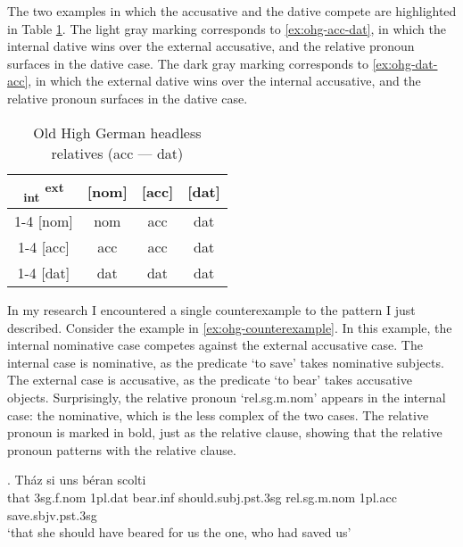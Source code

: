 The two examples in which the accusative and the dative compete are highlighted in Table \ref{tbl:summary-old-high-german-acc-dat}. The light gray marking corresponds to \ref{ex:ohg-acc-dat}, in which the internal dative wins over the external accusative, and the relative pronoun surfaces in the dative case. The dark gray marking corresponds to \ref{ex:ohg-dat-acc}, in which the external dative wins over the internal accusative, and the relative pronoun surfaces in the dative case.

\begin{table}[H]
  \center
  \caption{Old High German headless relatives (\ac{acc} --- \ac{dat})}
  \begin{tabular}{c|c|c|c}
    \toprule
        \textsubscript{\ac{int}} \textsuperscript{\ac{ext}}
          & [\ac{nom}]
          & [\ac{acc}]
          & [\ac{dat}]
          \\ \cmidrule{1-4}
      [\ac{nom}]
          & \ac{nom}
          & \ac{acc}
          & \ac{dat}
          \\ \cmidrule{1-4}
      [\ac{acc}]
          & \ac{acc}
          & \ac{acc}
          & \cellcolor{DG}\ac{dat}
          \\ \cmidrule{1-4}
      [\ac{dat}]
          & \ac{dat}
          & \cellcolor{LG}\ac{dat}
          & \ac{dat}
          \\
    \bottomrule
  \end{tabular}
    \label{tbl:summary-old-high-german-acc-dat}
\end{table}

In my research I encountered a single counterexample to the pattern I just described.
Consider the example in \ref{ex:ohg-counterexample}. In this example, the internal nominative case competes against the external accusative case.
The internal case is nominative, as the predicate  `to save' takes nominative subjects.
The external case is accusative, as the predicate  `to bear' takes accusative objects.
Surprisingly, the relative pronoun  `\ac{rel}.\ac{sg}.\ac{m}.\ac{nom}' appears in the internal case: the nominative, which is the less complex of the two cases. The relative pronoun is marked in bold, just as the relative clause, showing that the relative pronoun patterns with the relative clause.

\exg. Tház si uns béran scolti   \\
 that 3\ac{sg}.\ac{f}.\ac{nom} 1\ac{pl}.\ac{dat} bear.\ac{inf}\scsub{[acc]} should.\ac{subj}.\ac{pst}.3\ac{sg} \ac{rel}.\ac{sg}.\ac{m}.\ac{nom} 1\ac{pl}.\ac{acc} save.\ac{sbjv}.\ac{pst}.3\ac{sg}\scsub{[nom]}\\
 `that she should have beared for us the one, who had saved us' \label{ex:ohg-counterexample}

